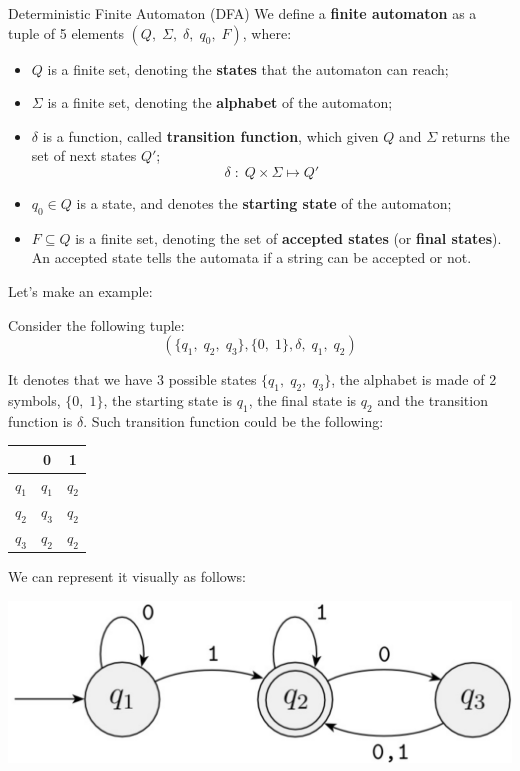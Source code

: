 \begin{definition}{Deterministic Finite Automaton (DFA)}
    We define a \textbf{finite automaton} as a tuple of 5 elements $(Q, \; \Sigma, \; \delta, \; q_{0}, \; F)$, where:
    \begin{itemize}
        \item $Q$ is a finite set, denoting the \textbf{states} that the automaton can reach;
        \item $\Sigma$ is a finite set, denoting the \textbf{alphabet} of the automaton;
        \item $\delta$ is a function, called \textbf{transition function}, which given $Q$ and $\Sigma$ returns the set of next states $Q'$;
        \[ \delta \; : \; Q \times \Sigma \longmapsto Q'  \]
        \item $q_{0} \in Q$ is a state, and denotes the \textbf{starting state} of the automaton;
        \item $F \subseteq Q$ is a finite set, denoting the set of \textbf{accepted states} (or \textbf{final states}). An accepted state tells the automata if a string can be accepted or not.
    \end{itemize}
\end{definition}

\noindent Let's make an example:

\begin{example}
    Consider the following tuple: 
    \[ (\{ q_{1}, \; q_{2}, \; q_{3} \}, \{ 0, \; 1 \}, \delta, \; q_{1}, \; q_{2}) \]
    
    \noindent It denotes that we have 3 possible states $\{ q_{1}, \; q_{2}, \; q_{3} \}$, the alphabet is made of 2 symbols, $\{ 0, \; 1 \}$, the starting state is $q_{1}$, the final state is $q_{2}$ and the transition function is $\delta$. Such transition function could be the following: 
    \begin{center}
        \begin{tabular}{c|c c}
            & 0 & 1 \\
            \hline
            $q_{1}$ & $q_{1}$ & $q_{2}$ \\
            $q_{2}$ & $q_{3}$ & $q_{2}$ \\
            $q_{3}$ & $q_{2}$ & $q_{2}$
        \end{tabular}
    \end{center}
    
    \noindent We can represent it visually as follows:
    \begin{center}
        \includegraphics[scale = 0.25]{imgs/001.png}
    \end{center}
\end{example}

